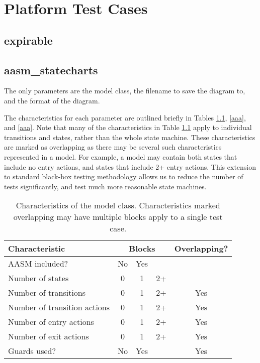 \documentclass[document.tex]{subfiles}
\begin{document}
\chapter{Platform Test Cases}
\label {ch:platform-test-cases}

\section {expirable}


\section {aasm\_statecharts}
\label {sec:platform-test-cases-aasm_statecharts}

The only parameters are the model class, the filename to save the diagram to, and the format of the diagram.

The characteristics for each parameter are outlined briefly in Tables \ref{tbl:platform-test-cases-aasm_statecharts-aasm-xtics}, \ref{aaa}, and \ref{aaa}. Note that many of the characteristics in Table \ref{tbl:platform-test-cases-aasm_statecharts-aasm-xtics} apply to individual transitions and states, rather than the whole state machine. These characteristics are marked as overlapping as there may be several such characteristics represented in a model. For example, a model may contain both states that include no entry actions, and states that include 2+ entry actions. This extension to standard black-box testing methodology allows us to reduce the number of tests significantly, and test much more reasonable state machines.

\begin{table}[!htbp]
  \centering
  \caption{Characteristics of the model class. Characteristics marked overlapping may have multiple blocks apply to a single test case.}
  \label{tbl:platform-test-cases-aasm_statecharts-aasm-xtics}

  \vspace{3mm}
  \begin{tabular}{l *{3}{c} c}
    \hline
    Characteristic & \multicolumn{3}{c}{Blocks} & Overlapping? \\
    \hline
    AASM included? & No & Yes & & \\
    Number of states & 0 & 1 & 2+ & \\
    Number of transitions & 0 & 1 & 2+ & Yes \\
    Number of transition actions & 0 & 1 & 2+ & Yes \\
    Number of entry actions & 0 & 1 & 2+ & Yes \\
    Number of exit actions & 0 & 1 & 2+ & Yes \\
    Guards used? & No & Yes & & Yes \\
    \hline
  \end{tabular}
\end{table}
\end{document}
